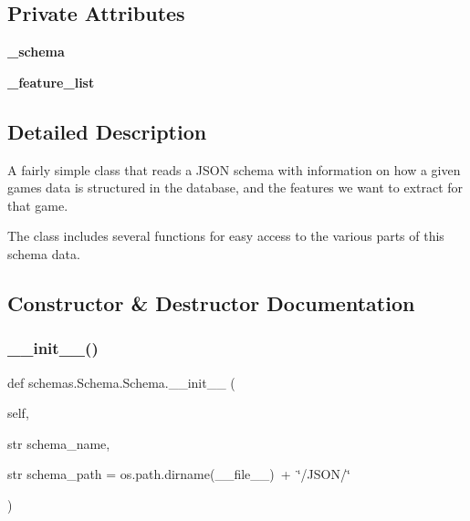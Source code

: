 \subsection*{Private Attributes}
\begin{DoxyCompactItemize}
\item 
\mbox{\label{classschemas_1_1_schema_1_1_schema_a26f967eb1a6bc8075e6866e97d3412c9}} 
{\bfseries \+\_\+schema}
\item 
\mbox{\label{classschemas_1_1_schema_1_1_schema_a0471e490085c79f8244d3dd9aa7c3c6c}} 
{\bfseries \+\_\+feature\+\_\+list}
\end{DoxyCompactItemize}


\subsection{Detailed Description}
A fairly simple class that reads a J\+S\+ON schema with information on how a given game\textquotesingle{}s data is structured in the database, and the features we want to extract for that game. 

The class includes several functions for easy access to the various parts of this schema data. 

\subsection{Constructor \& Destructor Documentation}
\mbox{\label{classschemas_1_1_schema_1_1_schema_a49117e762b38a7a2a3f7c1a25ab5e38c}} 
\subsubsection{\texorpdfstring{\_\_init\_\_()}{\_\_init\_\_()}}
{\footnotesize\ttfamily def schemas.\+Schema.\+Schema.\+\_\+\+\_\+init\+\_\+\+\_\+ (\begin{DoxyParamCaption}\item[{}]{self,  }\item[{str}]{schema\+\_\+name,  }\item[{str }]{schema\+\_\+path = {\ttfamily os.path.dirname(\+\_\+\+\_\+file\+\_\+\+\_\+)~+~\char`\"{}/JSON/\char`\"{}} }\end{DoxyParamCaption})}



